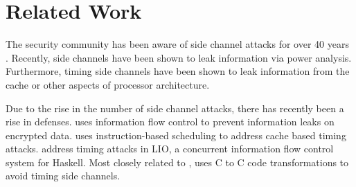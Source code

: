 \section{Related Work}
\label{sec:related}


The security community has been aware of side channel attacks for over 40 years \cite{lampson1973, wray1991, lipner1975}. Recently, side channels have been shown to leak information via power analysis\cite{Vaudenay2016}. Furthermore, timing side channels have been shown to leak information from the cache\cite{liu2015} or other aspects of processor architecture\cite{wang2004}.

Due to the rise in the number of side channel attacks, there has recently been a rise in defenses. \cite{planul2013,mitchell2012} uses information flow control to prevent information leaks on encrypted data. \cite{stefan2013} uses instruction-based scheduling to address cache based timing attacks. \cite{stefan2012,buiras2014} address timing attacks in LIO, a concurrent information flow control system for Haskell. Most closely related to \constc, \cite{molnar2005} uses C to C code transformations to avoid timing side channels.
